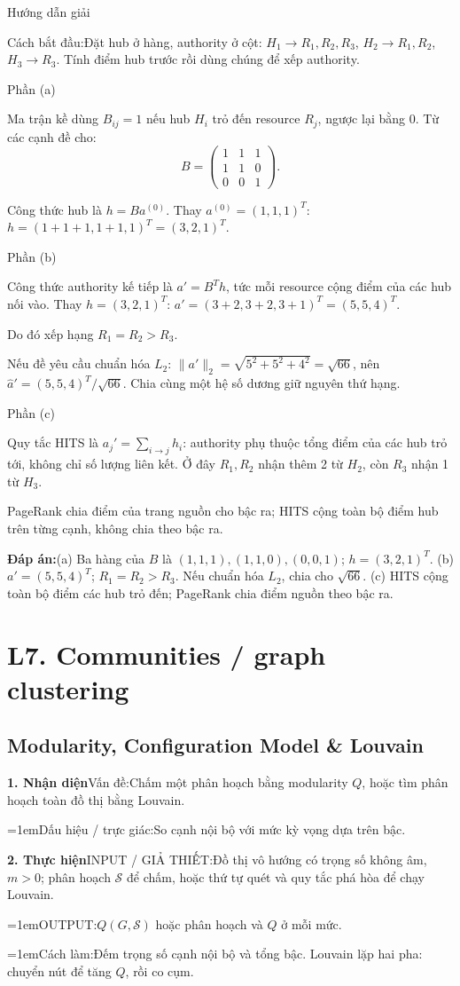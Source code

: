 \documentclass[10pt,a4paper,twocolumn]{article}
\makeatletter
\newcommand{\maptag}[1]{\phantomsection\@bsphack\protected@write\@auxout{}{\string\newlabel{#1}{{}{\thepage}{}{\@currentHref}{}}}\@esphack}
\newcommand{\lecture}[2]{%
  \par
  \section{L#1. #2}\label{lecture:#1}}
\newif\ifexamheadingprinted
\newcommand{\topic}[2]{%
  \global\examheadingprintedfalse\par\subsection{#2}\label{topic:#1}}
\newcommand{\key}[1]{#1:\enspace}
\newcommand{\solutionprompt}[1]{\par\addvspace{1pt}\noindent\key{Cách bắt đầu}#1\par\addvspace{2pt}}
\newcommand{\blocklabel}[1]{\par\noindent#1\par\nobreak}
\newcommand{\answer}[1]{%
  \par\addvspace{3pt}%
  \blocklabel{#1Hướng dẫn giải}}
\newcommand{\finalanswer}[1]{%
  \par\addvspace{3pt}\noindent\textbf{Đáp án:}\nobreak\enspace#1\par}
\newcommand{\guidepart}[1]{%
  \par\addvspace{1.5pt}%
  \blocklabel{Phần #1}}
\newcommand{\algfield}[2]{\par\noindent\hangindent=1em\relax#1:\enspace#2}
\newcommand{\unitfield}[4]{%
  \par\noindent\textbf{#1. #2}\enspace #3:\enspace #4}
\newcommand{\algsummary}[6]{%
  \begingroup\setlength{\parskip}{1pt}%
  \unitfield{1}{Nhận diện}{Vấn đề}{#1}%
  \algfield{Dấu hiệu / trực giác}{#2}%
  \if\relax\detokenize{#3}\relax\else\par\noindent#3\par\fi%
  \unitfield{2}{Thực hiện}{INPUT / GIẢ THIẾT}{#4}%
  \algfield{OUTPUT}{#5}%
  \algfield{Cách làm}{#6}\par\endgroup}
\makeatother
\begin{document}
\answer{\maptag{answer:Pr17}}
\solutionprompt{Đặt hub ở hàng, authority ở cột: $H_1\to R_1,R_2,R_3$, $H_2\to R_1,R_2$, $H_3\to R_3$. Tính điểm hub trước rồi dùng chúng để xếp authority.}
\guidepart{(a)}
\begin{guidesteps}
\item Ma trận kề dùng $B_{ij}=1$ nếu hub $H_i$ trỏ đến resource $R_j$, ngược lại bằng 0. Từ các cạnh đề cho:
\[
B=\begin{pmatrix}1&1&1\\1&1&0\\0&0&1\end{pmatrix}.
\]
\item Công thức hub là $h=Ba^{(0)}$. Thay $a^{(0)}=(1,1,1)^T$: $h=(1+1+1,1+1,1)^T=(3,2,1)^T$.
\end{guidesteps}
\guidepart{(b)}
\begin{guidesteps}
\item Công thức authority kế tiếp là $a'=B^Th$, tức mỗi resource cộng điểm của các hub nối vào. Thay $h=(3,2,1)^T$: $a'=(3+2,3+2,3+1)^T=(5,5,4)^T$.
\item Do đó xếp hạng $R_1=R_2>R_3$.
\item Nếu đề yêu cầu chuẩn hóa $L_2$: $\|a'\|_2=\sqrt{5^2+5^2+4^2}=\sqrt{66}$, nên $\widehat a'=(5,5,4)^T/\sqrt{66}$. Chia cùng một hệ số dương giữ nguyên thứ hạng.
\end{guidesteps}
\guidepart{(c)}
\begin{guidesteps}
\item Quy tắc HITS là $a_j'=\sum_{i\to j}h_i$: authority phụ thuộc tổng điểm của các hub trỏ tới, không chỉ số lượng liên kết. Ở đây $R_1,R_2$ nhận thêm 2 từ $H_2$, còn $R_3$ nhận 1 từ $H_3$.
\item PageRank chia điểm của trang nguồn cho bậc ra; HITS cộng toàn bộ điểm hub trên từng cạnh, không chia theo bậc ra.
\end{guidesteps}
\finalanswer{(a) Ba hàng của $B$ là $(1,1,1),(1,1,0),(0,0,1)$; $h=(3,2,1)^T$. (b) $a'=(5,5,4)^T$; $R_1=R_2>R_3$. Nếu chuẩn hóa $L_2$, chia cho $\sqrt{66}$. (c) HITS cộng toàn bộ điểm các hub trỏ đến; PageRank chia điểm nguồn theo bậc ra.}

\lecture{7}{Communities / graph clustering}
\topic{louvain}{Modularity, Configuration Model \& Louvain}

\algsummary{Chấm một phân hoạch bằng modularity $Q$, hoặc tìm phân hoạch toàn đồ thị bằng Louvain.}{So cạnh nội bộ với mức kỳ vọng dựa trên bậc.}{}{Đồ thị vô hướng có trọng số không âm, $m>0$; phân hoạch $\mathcal S$ để chấm, hoặc thứ tự quét và quy tắc phá hòa để chạy Louvain.}{$Q(G,\mathcal S)$ hoặc phân hoạch và $Q$ ở mỗi mức.}{Đếm trọng số cạnh nội bộ và tổng bậc. Louvain lặp hai pha: chuyển nút để tăng $Q$, rồi co cụm.}
\end{document}
